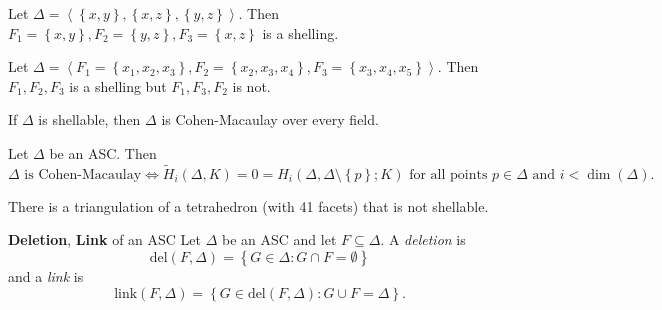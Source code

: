 \documentclass[co439]{subfiles}
\begin{document}
    \begin{example}{}
        Let $\Delta = \left< \left\lbrace x,y \right\rbrace, \left\lbrace x,z \right\rbrace, \left\lbrace y,z \right\rbrace \right>$. Then $F_1 = \left\lbrace x,y \right\rbrace, F_2=\left\lbrace y,z \right\rbrace, F_3=\left\lbrace x,z \right\rbrace$ is a shelling. 
    \end{example}

    \rruleline

    \begin{example}{}
        Let $\Delta = \left< F_1=\left\lbrace x_1,x_2,x_3 \right\rbrace , F_2=\left\lbrace x_2,x_3,x_4 \right\rbrace, F_3=\left\lbrace x_3,x_4,x_5 \right\rbrace \right>$. Then $F_1,F_2,F_3$ is a shelling but $F_1,F_3,F_2$ is not.
    \end{example}

    \rruleline

    \begin{theorem}{}
        If $\Delta$ is shellable, then $\Delta$ is Cohen-Macaulay over every field.
    \end{theorem}

    \rruleline
    
    \begin{theorem}{}
        Let $\Delta$ be an ASC. Then
        \begin{equation*}
            \Delta\text{ is Cohen-Macaulay} \iff \tilde{H}_i\left( \Delta,K \right) = 0 = H_i\left( \Delta,\Delta\setminus \left\lbrace p \right\rbrace; K \right) \text{ for all points $p\in\Delta$ and $i<\dim\left( \Delta \right)$}.
        \end{equation*}
    \end{theorem}
    
    \rruleline

    \begin{theorem}{}
        There is a triangulation of a tetrahedron (with 41 facets) that is not shellable.
    \end{theorem}

    \rruleline

    \clearpage

    \begin{definition}{\textbf{Deletion}, \textbf{Link} of an ASC}
        Let $\Delta$ be an ASC and let $F\subseteq\Delta$. A \emph{deletion} is
        \begin{equation*}
            \text{del}\left( F,\Delta \right) = \left\lbrace G\in\Delta: G\cap F=\emptyset \right\rbrace
        \end{equation*}
        and a \emph{link} is
        \begin{equation*}
            \text{link}\left( F,\Delta \right) = \left\lbrace G\in\text{del}\left( F,\Delta \right):G\cup F = \Delta \right\rbrace.
        \end{equation*}
    \end{definition}
\end{document}

